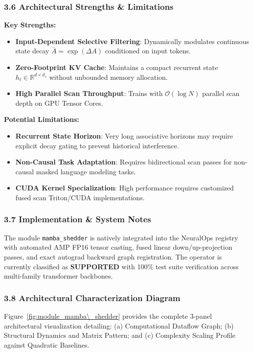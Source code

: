 \subsubsection*{3.6 Architectural Strengths \& Limitations}
\textbf{Key Strengths:}
\begin{itemize}
    \item \textbf{Input-Dependent Selective Filtering}: Dynamically modulates continuous state decay $\bar{A} = \exp(\Delta A)$ conditioned on input tokens.
    \item \textbf{Zero-Footprint KV Cache}: Maintains a compact recurrent state $h_t \in \mathbb{R}^{d \times d_s}$ without unbounded memory allocation.
    \item \textbf{High Parallel Scan Throughput}: Trains with $\mathcal{O}(\log N)$ parallel scan depth on GPU Tensor Cores.
\end{itemize}

\textbf{Potential Limitations:}
\begin{itemize}
    \item \textbf{Recurrent State Horizon}: Very long associative horizons may require explicit decay gating to prevent historical interference.
    \item \textbf{Non-Causal Task Adaptation}: Requires bidirectional scan passes for non-causal masked language modeling tasks.
    \item \textbf{CUDA Kernel Specialization}: High performance requires customized fused scan Triton/CUDA implementations.
\end{itemize}

\subsubsection*{3.7 Implementation \& System Notes}
The module \texttt{mamba\_shedder} is natively integrated into the NeuralOps registry with automated AMP FP16 tensor casting, fused linear down/up-projection passes, and exact autograd backward graph registration. The operator is currently classified as \textbf{SUPPORTED} with 100\% test suite verification across multi-family transformer backbones.

\subsubsection*{3.8 Architectural Characterization Diagram}
Figure~\ref{fig:module_mamba\_shedder} provides the complete 3-panel architectural visualization detailing: (a) Computational Dataflow Graph; (b) Structural Dynamics and Matrix Pattern; and (c) Complexity Scaling Profile against Quadratic Baselines.


